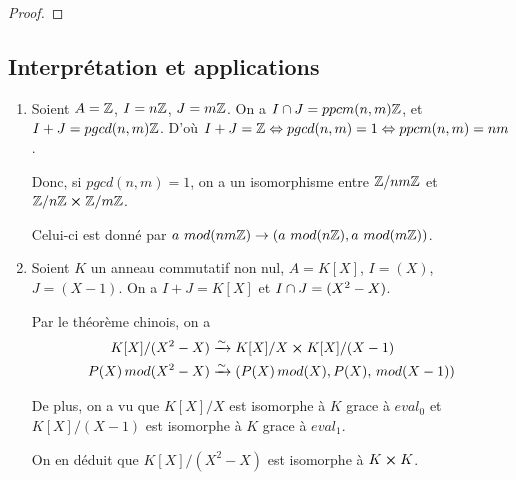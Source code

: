 \ifdefined\outputproof
\begin{proof}

\end{proof}
\fi

\subsection{Interprétation et applications}

\begin{exemple}
	\begin{enumerate}
		\item Soient $A = \mathbb{Z}$, $I = n \mathbb{Z}$, $J = m\mathbb{Z}$. On a $I
			\cap J = ppcm(n, m) \mathbb{Z}$, et $I + J = pgcd(n, m) \mathbb{Z}$.
			D'où $I + J = \mathbb{Z} \Leftrightarrow pgcd(n, m) = 1 \Leftrightarrow ppcm(n, m) =
			nm$.

			Donc, si $pgcd(n, m) = 1$, on a un isomorphisme entre $\mathbb{Z} / nm
			\mathbb{Z}$ et $\mathbb{Z} / n \mathbb{Z} \cross \mathbb{Z} / m
			\mathbb{Z}$.

			Celui-ci est donné par $a \, \, mod(nm \mathbb{Z}) \rightarrow (a \,
			\, mod(n
			\mathbb{Z}), a \, \, mod(m \mathbb{Z}))$.
		\item Soient $K$ un anneau commutatif non nul, $A = K[X]$, $I = (X)$, $J
			= (X - 1)$. On a $I + J = K[X]$ et $I \cap J = (X^{2} - X)$.

			Par le théorème chinois, on a
			\begin{align}
				K[X] / (X^{2} - X) & \xrightarrow{\sim} K[X] / X \cross K[X] / (X -
				1) \\
				P(X) \, mod(X^{2} - X) & \xrightarrow{\sim} (P(X) \, mod(X), P(X), \,
				mod(X - 1))
			\end{align}

			De plus, on a vu que $K[X] / X$ est isomorphe à $K$ grace à
			$eval_{0}$ et $K[X] / (X - 1)$ est isomorphe à $K$ grace à
			$eval_{1}$.

			On en déduit que $K[X] / (X^{2} - X)$ est isomorphe à $K \cross
			K$.
	\end{enumerate}
\end{exemple}



